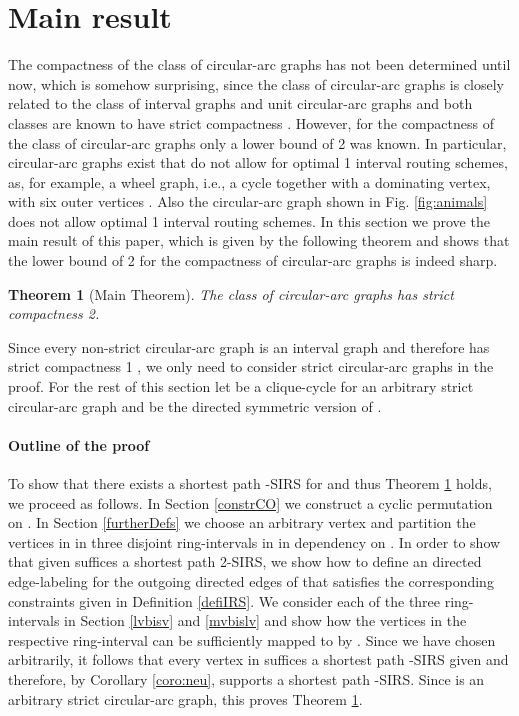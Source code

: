 \documentclass[10pt]{article}
\newtheorem{theorem}{Theorem}[section]
\begin{document}
\section{Main result\label{main}}


The compactness of the class of circular-arc graphs has not been determined until now, 
which is somehow surprising, since the class of circular-arc graphs is closely related 
to the class of interval graphs and unit circular-arc graphs and both classes are known 
to have strict compactness  \cite{NS96,FG98}. 
However, for the compactness of the class of circular-arc graphs only a lower bound of 2 was known.
In particular, circular-arc graphs exist that do not allow for optimal 1 interval routing schemes, as, for example, a wheel graph, i.e., a cycle together with a dominating vertex, with six outer vertices \cite{FG98}.
Also the circular-arc graph shown in Fig. \ref{fig:animals} does not allow optimal 1 interval routing schemes.
In this section we prove the main result of this paper, which is given by the following theorem and shows that the lower bound of 2 for the compactness of circular-arc graphs is indeed sharp.

\begin{theorem}[Main Theorem]\label{mainTheo}
The class of circular-arc graphs has strict compactness 2.
\end{theorem}



Since every non-strict circular-arc graph  is an interval graph and therefore has strict compactness 1 \cite{NS96},  we only need to consider strict circular-arc graphs in the proof.
For the rest of this section let  be a clique-cycle for an 
arbitrary strict circular-arc graph  and  be the directed symmetric 
version of . 

\paragraph*{Outline of the proof}
To show that there exists a shortest path -SIRS for  and thus 
Theorem \ref{mainTheo} holds, we proceed as follows. 
In Section \ref{constrCO} we construct 
a cyclic permutation  on .
In Section \ref{furtherDefs} we choose an arbitrary vertex  and partition the 
vertices in  in three disjoint ring-intervals  in  in 
dependency on . 
In order to show that  given  suffices a shortest path 2-SIRS, 
we show how to define an directed edge-labeling  for the outgoing directed edges of  that 
satisfies the corresponding  constraints given in Definition \ref{defiIRS}. We
consider each of the three ring-intervals  in 
Section  \ref{lvbisv} and \ref{mvbislv} and 
show how the vertices in the respective ring-interval can be sufficiently  mapped to 
by . 
Since we have chosen  arbitrarily, it follows that every vertex in  
suffices a shortest path -SIRS given  and therefore, by 
Corollary \ref{coro:neu},  supports a shortest path -SIRS.
Since  is an arbitrary strict circular-arc graph, this proves 
Theorem \ref{mainTheo}.
\end{document}
